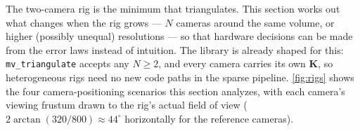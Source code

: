 \documentclass[11pt]{article}
\theoremstyle{definition}
\newcommand{\mat}[1]{\mathbf{#1}}
\newcommand{\K}{\mat{K}}
\newcommand{\code}[1]{\texttt{#1}}
\begin{document}
The two-camera rig is the minimum that triangulates. This section works out
what changes when the rig grows --- $N$ cameras around the same volume, or
higher (possibly unequal) resolutions --- so that hardware decisions can be
made from the error laws instead of intuition. The library is already
shaped for this: \code{mv\_triangulate} accepts any $N\ge2$, and every
camera carries its own $\K$, so heterogeneous rigs need no new code paths in
the sparse pipeline. \autoref{fig:rigs} shows the four camera-positioning
scenarios this section analyzes, with each camera's viewing frustum drawn
to the rig's actual field of view ($2\arctan(320/800)\approx44^\circ$
horizontally for the reference cameras).

\newcommand{\camw}[5]{%
  \fill[blue!30, fill opacity=0.35]
    (#1,#2) -- ++({#3-#4}:#5) arc ({#3-#4}:{#3+#4}:#5) -- cycle;
  \fill[black] (#1,#2) circle (1.6pt);}
\end{document}
